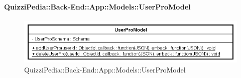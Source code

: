 \paragraph{QuizziPedia::Back-End::App::Models::UserProModel}
\label{QuizziPedia::Back-End::App::Models::UserProModel}
\begin{figure}[ht]
	\centering
	\includegraphics[scale=0.7]{UML/Classi/Back-End/QuizziPedia_Back-End_App_Models_userProModel.png}
	\caption{QuizziPedia::Back-End::App::Models::UserProModel}
\end{figure}
\FloatBarrier
